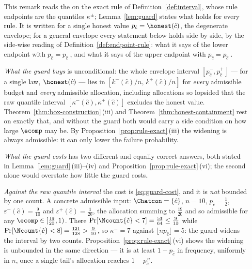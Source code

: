 
\begin{remark}\label{rem:guard}
This remark reads the  on the exact rule of
Definition~\ref{def:interval}, whose rule endpoints are the quantiles
$\kappa^{\pm}$; Lemma~\ref{lem:guard} states what holds for every rule. It is
written for a single honest value $p_{\hat c}=\honest(\hat c)$, the
degenerate envelope; for a general envelope every statement below holds side
by side, by the side-wise reading of Definition~\ref{def:endpoint-rule}: what
it says of the lower endpoint with $p_{\hat c}=p^{-}_{\hat c}$, and what it
says of the upper endpoint with $p_{\hat c}=p^{+}_{\hat c}$.

\emph{What the guard buys} is unconditional: the whole envelope interval
$[p^{-}_{\hat c},p^{+}_{\hat c}]$ --- for a single law, $\honest(\hat c)$ ---
lies in $[k^{-}(\hat c)/n,\,k^{+}(\hat c)/n]$ for \emph{every} admissible
budget and \emph{every} admissible allocation, including allocations so
lopsided that the raw quantile interval
$[\kappa^{-}(\hat c),\kappa^{+}(\hat c)]$ excludes the honest value.
Theorem~\ref{thm:box-construction}\,(iii) and Theorem~\ref{thm:honest-containment} rest on exactly that,
and without the guard both would carry a side condition on how large
$\ecomp$ may be. By Proposition~\ref{prop:rule-exact}\,(iii) the widening is
always admissible: it can only lower the failure probability.

\emph{What the guard costs} has two different and equally correct answers,
both stated in Lemma~\ref{lem:guard}\,(iii)--(iv) and
Proposition~\ref{prop:rule-exact}\,(vi); the second alone would overstate how
little the guard costs.

\emph{Against the raw quantile interval} the cost is \eqref{eq:guard-cost},
and it is \emph{not} bounded by one count. A concrete admissible input:
$\Chatcon=\{\hat c\}$, $n=10$, $p_{\hat c}=\tfrac12$,
$\varepsilon^{-}(\hat c)=\tfrac9{10}$ and $\varepsilon^{+}(\hat c)=\tfrac1{20}$,
the allocation summing to $\tfrac{19}{20}$ and so admissible for any
$\ecomp\in[\tfrac{19}{20},1)$. There
$\Pr[\Ncount{\hat c}<7]=\tfrac{53}{64}\le\tfrac9{10}$ while
$\Pr[\Ncount{\hat c}<8]=\tfrac{121}{128}>\tfrac9{10}$, so $\kappa^{-}=7$
against $\lfloor np_{\hat c}\rfloor=5$: the guard widens the interval by two
counts. Proposition~\ref{prop:rule-exact}\,(vi) shows the widening is
unbounded in the same direction --- it is at least $1-p_{\hat c}$ in
frequency, uniformly in $n$, once a single tail's allocation reaches
$1-p_{\hat c}^{\,n}$.


\end{remark}
